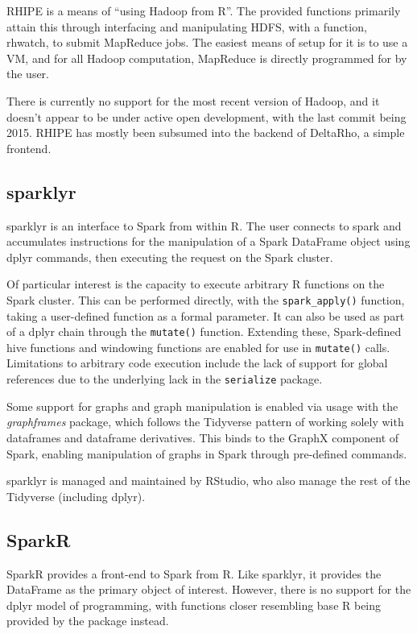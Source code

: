 \documentclass[a4paper,10pt]{article}
\begin{document}
RHIPE is a means of ``using Hadoop from R''\cite{deltarho:_rhipe}. The
provided functions primarily attain this through interfacing and
manipulating HDFS, with a function, rhwatch, to submit MapReduce jobs.
The easiest means of setup for it is to use a VM, and for all Hadoop
computation, MapReduce is directly programmed for by the user.

There is currently no support for the most recent version of Hadoop,
and it doesn't appear to be under active open development, with the
last commit being 2015. RHIPE has mostly been subsumed into the
backend of DeltaRho, a simple frontend.

\subsection{sparklyr}
\label{sec:sparklyr}

sparklyr is an interface to Spark from within R\cite{luraschi20}. The user
connects to spark and accumulates instructions for the manipulation of a Spark
DataFrame object using dplyr commands, then executing the request on the Spark
cluster.

Of particular interest is the capacity to execute arbitrary R functions on the
Spark cluster. This can be performed directly, with the \texttt{spark\_apply()}
function, taking a user-defined function as a formal parameter. It can also be
used as part of a dplyr chain through the \texttt{mutate()} function. Extending
these, Spark-defined hive functions and windowing functions are enabled for use
in \texttt{mutate()} calls. Limitations to arbitrary code execution include the
lack of support for global references due to the underlying lack in the
\texttt{serialize} package.

Some support for graphs and graph manipulation is enabled via usage with the
\textit{graphframes} package, which follows the Tidyverse pattern of working
solely with dataframes and dataframe derivatives\cite{kuo18}. This binds to the GraphX
component of Spark, enabling manipulation of graphs in Spark through
pre-defined commands.

sparklyr is managed and maintained by RStudio, who also manage the
rest of the Tidyverse (including dplyr).

\subsection{SparkR}
\label{sec:sparkr}

SparkR provides a front-end to Spark from
R\cite{venkataraman20:_spark}. Like sparklyr, it provides the
DataFrame as the primary object of interest. However, there is no
support for the dplyr model of programming, with functions closer
resembling base R being provided by the package instead.
\end{document}
